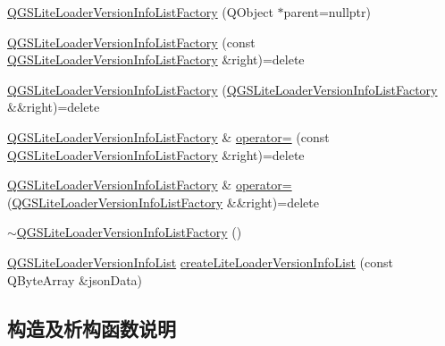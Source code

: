 \begin{DoxyCompactItemize}
\item 
\mbox{\hyperlink{class_q_g_s_lite_loader_version_info_list_factory_a5ecfb33c4f68498ea5d7f64edca628b3}{Q\+G\+S\+Lite\+Loader\+Version\+Info\+List\+Factory}} (Q\+Object $\ast$parent=nullptr)
\item 
\mbox{\hyperlink{class_q_g_s_lite_loader_version_info_list_factory_a742b1e23b7ed174bb314380023987046}{Q\+G\+S\+Lite\+Loader\+Version\+Info\+List\+Factory}} (const \mbox{\hyperlink{class_q_g_s_lite_loader_version_info_list_factory}{Q\+G\+S\+Lite\+Loader\+Version\+Info\+List\+Factory}} \&right)=delete
\item 
\mbox{\hyperlink{class_q_g_s_lite_loader_version_info_list_factory_a7efc35f5baf57b3e59e82e460f77697b}{Q\+G\+S\+Lite\+Loader\+Version\+Info\+List\+Factory}} (\mbox{\hyperlink{class_q_g_s_lite_loader_version_info_list_factory}{Q\+G\+S\+Lite\+Loader\+Version\+Info\+List\+Factory}} \&\&right)=delete
\item 
\mbox{\hyperlink{class_q_g_s_lite_loader_version_info_list_factory}{Q\+G\+S\+Lite\+Loader\+Version\+Info\+List\+Factory}} \& \mbox{\hyperlink{class_q_g_s_lite_loader_version_info_list_factory_ac05cbb2d49e7f805563ccf4165914096}{operator=}} (const \mbox{\hyperlink{class_q_g_s_lite_loader_version_info_list_factory}{Q\+G\+S\+Lite\+Loader\+Version\+Info\+List\+Factory}} \&right)=delete
\item 
\mbox{\hyperlink{class_q_g_s_lite_loader_version_info_list_factory}{Q\+G\+S\+Lite\+Loader\+Version\+Info\+List\+Factory}} \& \mbox{\hyperlink{class_q_g_s_lite_loader_version_info_list_factory_ade4e0177906ed7c1cc25f648c40c1d72}{operator=}} (\mbox{\hyperlink{class_q_g_s_lite_loader_version_info_list_factory}{Q\+G\+S\+Lite\+Loader\+Version\+Info\+List\+Factory}} \&\&right)=delete
\item 
\mbox{\hyperlink{class_q_g_s_lite_loader_version_info_list_factory_ab6ddaa0d24c6cacc4fefad90a12f28d4}{$\sim$\+Q\+G\+S\+Lite\+Loader\+Version\+Info\+List\+Factory}} ()
\item 
\mbox{\hyperlink{class_q_g_s_lite_loader_version_info_list}{Q\+G\+S\+Lite\+Loader\+Version\+Info\+List}} \mbox{\hyperlink{class_q_g_s_lite_loader_version_info_list_factory_af67f1fd46e15e0cdfa0e2ae61079eaf3}{create\+Lite\+Loader\+Version\+Info\+List}} (const Q\+Byte\+Array \&json\+Data)
\end{DoxyCompactItemize}


\subsection{构造及析构函数说明}
\mbox{\label{class_q_g_s_lite_loader_version_info_list_factory_a5ecfb33c4f68498ea5d7f64edca628b3}} 
